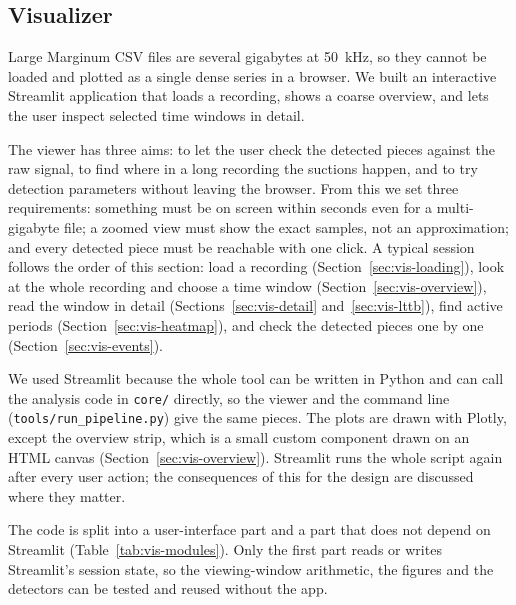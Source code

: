 \subsection{Visualizer}
\label{sec:visualizer-methods}

Large Marginum CSV files are several gigabytes at \SI{50}{\kilo\hertz}, so they cannot be
loaded and plotted as a single dense series in a browser. We built an interactive
Streamlit application that loads a recording, shows a coarse overview, and lets the user
inspect selected time windows in detail.

The viewer has three aims: to let the user check the detected pieces against the raw
signal, to find where in a long recording the suctions happen, and to try detection
parameters without leaving the browser. From this we set three requirements: something
must be on screen within seconds even for a multi-gigabyte file; a zoomed view must show
the exact samples, not an approximation; and every detected piece must be reachable with
one click. A typical session follows the order of this section: load a recording
(Section~\ref{sec:vis-loading}), look at the whole recording and choose a time window
(Section~\ref{sec:vis-overview}), read the window in detail (Sections~\ref{sec:vis-detail}
and~\ref{sec:vis-lttb}), find active periods (Section~\ref{sec:vis-heatmap}), and check
the detected pieces one by one (Section~\ref{sec:vis-events}).

We used Streamlit because the whole tool can be written in Python and can call the
analysis code in \texttt{core/} directly, so the viewer and the command line
(\texttt{tools/run\_pipeline.py}) give the same pieces. The plots are drawn with Plotly,
except the overview strip, which is a small custom component drawn on an HTML canvas
(Section~\ref{sec:vis-overview}). Streamlit runs the whole script again after every user
action; the consequences of this for the design are discussed where they matter.

The code is split into a user-interface part and a part that does not depend on
Streamlit (Table~\ref{tab:vis-modules}). Only the first part reads or writes Streamlit's
session state, so the viewing-window arithmetic, the figures and the detectors can be
tested and reused without the app.

